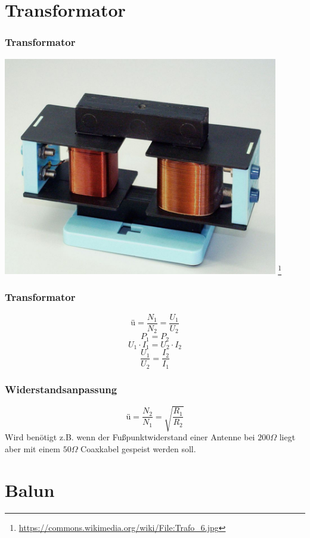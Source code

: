  \section*{Transformator}
\begin{frame}
    \frametitle{Transformator}
        \begin{center}
        \includegraphics[width=0.9\textwidth]{a03/trafo-Real.jpg}
        \footnote{\tiny \url{https://commons.wikimedia.org/wiki/File:Trafo_6.jpg}}
         \end{center}
\end{frame}

\begin{frame}
    \frametitle{Transformator}
    $$\text{\"u} = \frac{N_1}{N_2} = \frac{U_1}{U_2}$$
    	\vspace{1cm}
    $$P_1 = P_2$$
    $$U_{1} \cdot I_1 = U_{2} \cdot I_2 $$
  \huge  $$\frac{U_1}{U_2} = \frac{I_2}{I_1}$$
\end{frame}

\begin{frame}
    \frametitle{Widerstandsanpassung}
   \huge  $$\text{\"u} = \frac{N_2}{N_1} = \sqrt{\frac{R_1}{R_2}}$$
    	\vspace{1cm}
    \normalsize Wird benötigt z.B. wenn der Fußpunktwiderstand einer Antenne bei $200 \Omega$ liegt aber mit einem $50\Omega$ Coaxkabel gespeist werden soll.
\end{frame}

\section*{Balun}

